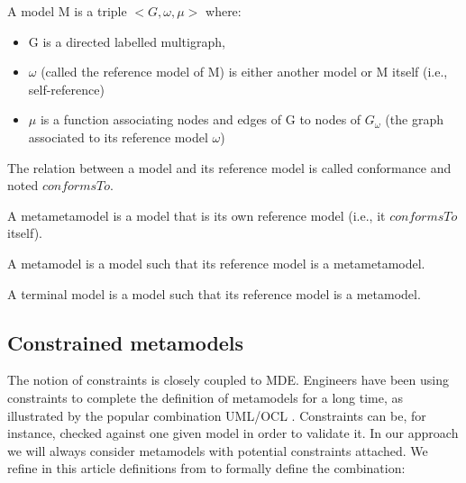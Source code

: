 \documentclass{llncs}
\begin{document}
\begin{definition} [model] A model M is a triple $<G, \omega,
\mu>$ where:
\begin{itemize}
\item G is a directed labelled multigraph,
\item $\omega$ (called the reference model of M) is either another model or M itself (i.e., self-reference)
\item $\mu$ is a function associating nodes and edges of G to nodes of $G_\omega$ (the graph associated to its reference model $\omega$)
\end{itemize}
\end{definition}
%
\begin{definition}[conformance] The relation between a model and its reference model is called conformance and noted $conformsTo$.
\end{definition}
%
\begin{definition}[metametamodel] A metametamodel is a model that is its own
reference model (i.e., it $conformsTo$ itself).
\end{definition}
\begin{definition}[metamodel] A metamodel is a model such that its reference
model is a metametamodel.
\end{definition}
\begin{definition} A terminal model is a model such that its
reference model is a metamodel.
\end{definition}
%
\subsection{Constrained metamodels}
%
The notion of constraints is closely coupled to MDE. Engineers have been using
constraints to complete the definition of metamodels for a long time, as
illustrated by the popular combination UML/OCL \cite{OCL-spec}. Constraints can be, for instance,
checked against one given model in order to validate it. In our approach we
will always consider metamodels with potential constraints attached. We
refine in this article definitions from \cite{modelsearch09} to formally define
the combination: 
\end{document}
